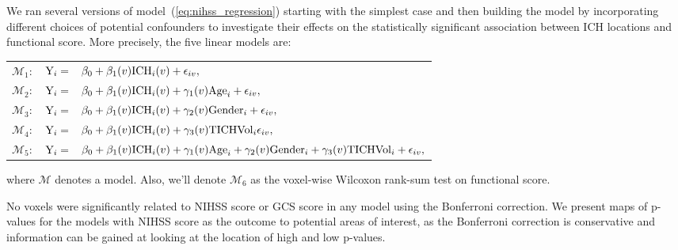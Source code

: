 \documentclass[10pt]{article}\usepackage[]{graphicx}\usepackage[]{color}
\begin{document}
We ran several versions of model~(\ref{eq:nihss_regression}) starting with the simplest case and then building the model by incorporating different choices of potential confounders to investigate their effects on the statistically significant association between ICH locations and functional score. More precisely, the five linear models are:

\vspace{0.1in}
\begin{tabular}{rll}
\noindent $\mathcal{M}_1:$ & $ {\rm Y}_i =$ & \hspace{-0.18in} $\beta_0+\beta_1(v) {\rm ICH}_i(v) + \epsilon_{iv}, $\\
$\mathcal{M}_2:$ & $ {\rm Y}_i = $ & \hspace{-0.18in} $ \beta_0+\beta_1(v) {\rm ICH}_i(v) + \gamma_1(v){\rm Age}_i + \epsilon_{iv}, $\\
$\mathcal{M}_3:$ & $ {\rm Y}_i = $ & \hspace{-0.18in} $ \beta_0+\beta_1(v) {\rm ICH}_i(v) + \gamma_2(v){\rm Gender}_i + \epsilon_{iv}, $\\
$\mathcal{M}_4:$ &$  {\rm Y}_i = $ & \hspace{-0.18in} $ \beta_0+\beta_1(v) {\rm ICH}_i(v) + \gamma_3(v){\rm TICHVol}_i \epsilon_{iv},$ \\
$\mathcal{M}_5:$ &$  {\rm Y}_i = $ & \hspace{-0.18in} $ \beta_0+\beta_1(v) {\rm ICH}_i(v) + \gamma_1(v){\rm Age}_i  +\gamma_2(v){\rm Gender}_i +\gamma_3(v){\rm TICHVol}_i + \epsilon_{iv},$ \\
\end{tabular}
\vspace{0.1in}
\newline
where $\mathcal{M}$ denotes a model.  Also, we'll denote $\mathcal{M}_6$ as the voxel-wise Wilcoxon rank-sum test on functional score.  

No voxels were significantly related to NIHSS score or GCS score in any model using the Bonferroni correction.  We present maps of p-values for the models with NIHSS score as the outcome to potential areas of interest, as the Bonferroni correction is conservative and information can be gained at looking at the location of high and low p-values. 
\end{document}

